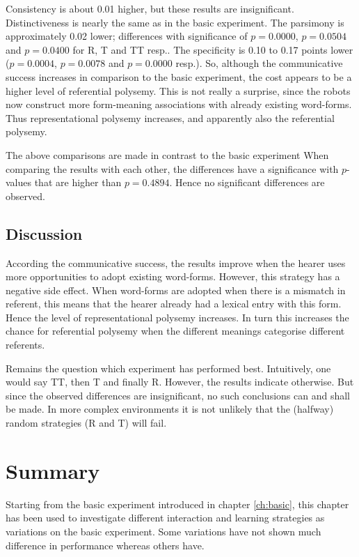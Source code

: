 Consistency is about 0.01 higher, but these results are insignificant. Distinctiveness is nearly the same as in the basic experiment. The parsimony is approximately 0.02 lower; differences with significance of $p=0.0000$, $p=0.0504$ and $p=0.0400$ for R, T and TT resp.. The specificity is 0.10 to 0.17 points lower ($p=0.0004$, $p=0.0078$ and $p=0.0000$ resp.). So, although the communicative success increases in comparison to the basic experiment, the cost appears to be a higher level of referential polysemy. This is not really a surprise, since the robots now construct more form-meaning associations with already existing word-forms. Thus representational polysemy increases, and apparently also the referential polysemy.

The above comparisons are made in contrast to the basic experiment When comparing the results with each other, the differences have a significance with $p$-values that are higher than $p=0.4894$. Hence no significant differences are observed.

\subsection{Discussion}

According the communicative success, the results improve when the hearer uses more opportunities to adopt existing word-forms. However, this strategy has a negative side effect. When word-forms are adopted when there is a mismatch in referent, this means that the hearer already had a lexical entry with this form. Hence the level of representational polysemy increases. In turn this increases the chance for referential polysemy when the different meanings categorise different referents.

Remains the question which experiment has performed best. Intuitively, one would say TT, then T and finally R. However, the results indicate otherwise. But since the observed differences are insignificant, no such conclusions can and shall be made. In more complex environments it is not unlikely that the (halfway) random strategies (R and T) will fail.


\section{Summary}

Starting from the basic experiment introduced in chapter \ref{ch:basic}, this chapter has been used to investigate different interaction and learning strategies as variations on the basic experiment. Some variations have not shown much difference in performance whereas others have.


